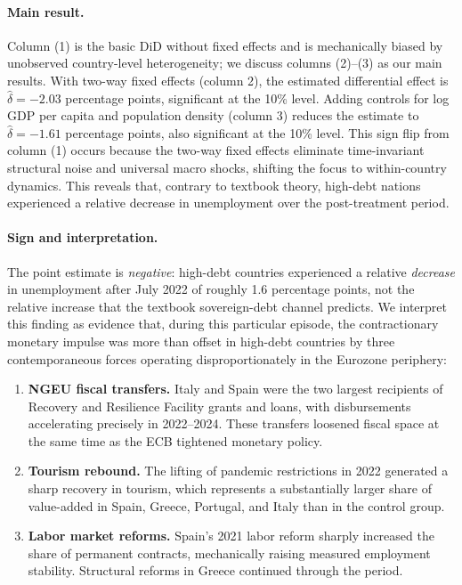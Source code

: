 \documentclass[11pt,a4paper]{article}
\begin{document}
\begin{table}[H]
    \raggedleft
    
\end{table}

\paragraph{Main result.} Column (1) is the basic DiD without fixed effects and is mechanically biased by unobserved country-level heterogeneity; we discuss columns (2)--(3) as our main results. With two-way fixed effects (column 2), the estimated differential effect is $\hat{\delta} = -2.03$ percentage points, significant at the 10\% level. Adding controls for log GDP per capita and population density (column 3) reduces the estimate to $\hat{\delta} = -1.61$ percentage points, also significant at the 10\% level. This sign flip from column (1) occurs because the two-way fixed effects eliminate time-invariant structural noise and universal macro shocks, shifting the focus to within-country dynamics. This reveals that, contrary to textbook theory, high-debt nations experienced a relative decrease in unemployment over the post-treatment period.

\paragraph{Sign and interpretation.} The point estimate is \emph{negative}: high-debt countries experienced a relative \emph{decrease} in unemployment after July 2022 of roughly 1.6 percentage points, not the relative increase that the textbook sovereign-debt channel predicts. We interpret this finding as evidence that, during this particular episode, the contractionary monetary impulse was more than offset in high-debt countries by three contemporaneous forces operating disproportionately in the Eurozone periphery:

\begin{enumerate}
    \item \textbf{NGEU fiscal transfers.} Italy and Spain were the two largest recipients of Recovery and Resilience Facility grants and loans, with disbursements accelerating precisely in 2022--2024. These transfers loosened fiscal space at the same time as the ECB tightened monetary policy.
    \item \textbf{Tourism rebound.} The lifting of pandemic restrictions in 2022 generated a sharp recovery in tourism, which represents a substantially larger share of value-added in Spain, Greece, Portugal, and Italy than in the control group.
    \item \textbf{Labor market reforms.} Spain's 2021 labor reform sharply increased the share of permanent contracts, mechanically raising measured employment stability. Structural reforms in Greece continued through the period.
\end{enumerate}
\end{document}
